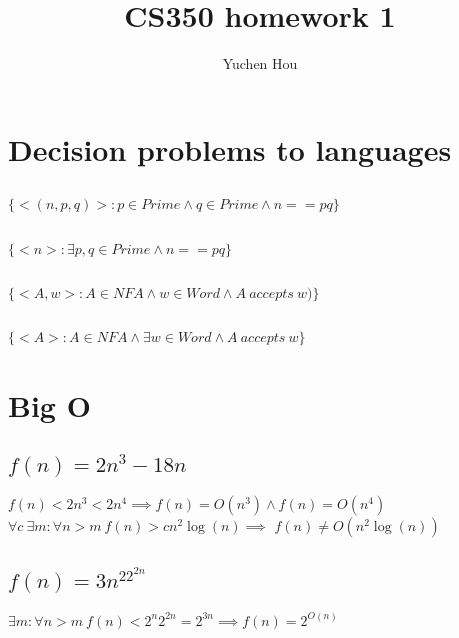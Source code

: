 \documentclass{article}
\begin{document}
\title{CS350 homework 1}
\author{Yuchen Hou}
\maketitle

\section{Decision problems to languages}

\subsection{}
$\{<(n, p, q)>: p \in Prime \land q \in Prime \land n == pq\}$

\subsection{}
$\{<n>: \exists p, q \in Prime \land n == pq\}$

\subsection{}
$\{<A, w>: A \in NFA \land w \in Word \land A \ accepts \ w)\}$

\subsection{}
$\{<A>: A \in NFA \land \exists w \in Word \land A \ accepts \ w\}$

\section{Big O}

\subsection{$f(n) = 2n^3 - 18n$}
$f(n) < 2n^3 < 2n^4 \implies f(n) = O(n^3) \land f(n) = O(n^4)$\\
$\forall c \ \exists m: \forall n > m \ f(n) > cn^2 \log(n) \implies$ $f(n) \neq
O(n^2 \log(n))$

\subsection{$f(n) = 3n^22^{2n}$}
$\exists m: \forall n > m \ f(n) < 2^n 2^{2n} = 2^{3n} \implies f(n) = 2^{O(n)}$
\end{document}
